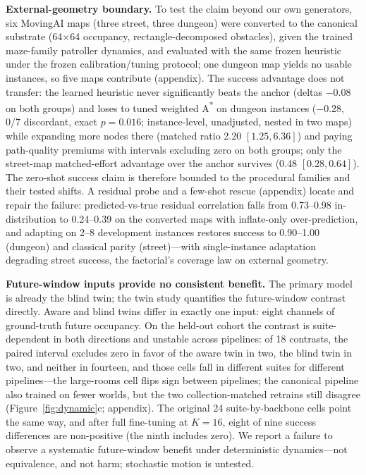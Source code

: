 \documentclass[letterpaper]{article} %
\begin{document}
\textbf{External-geometry boundary.} To test the claim beyond our own generators, six MovingAI maps \citep{sturtevant2012movingai} (three street, three dungeon) were converted to the canonical substrate (64$\times$64 occupancy, rectangle-decomposed obstacles), given the trained maze-family patroller dynamics, and evaluated with the same frozen heuristic under the frozen calibration/tuning protocol; one dungeon map yields no usable instances, so five maps contribute (appendix). The success advantage does not transfer: the learned heuristic never significantly beats the anchor (deltas $-0.08$ on both groups) and loses to tuned weighted A\textsuperscript{*} on dungeon instances ($-0.28$, 0/7 discordant, exact $p{=}0.016$; instance-level, unadjusted, nested in two maps) while expanding more nodes there (matched ratio 2.20 $[1.25, 6.36]$) and paying path-quality premiums with intervals excluding zero on both groups; only the street-map matched-effort advantage over the anchor survives (0.48 $[0.28, 0.64]$). The zero-shot success claim is therefore bounded to the procedural families and their tested shifts. A residual probe and a few-shot rescue (appendix) locate and repair the failure: predicted-vs-true residual correlation falls from 0.73--0.98 in-distribution to 0.24--0.39 on the converted maps with inflate-only over-prediction, and adapting on 2--8 development instances restores success to 0.90--1.00 (dungeon) and classical parity (street)---with single-instance adaptation degrading street success, the factorial's coverage law on external geometry.

\textbf{Future-window inputs provide no consistent benefit.} The primary model is already the blind twin; the twin study quantifies the future-window contrast directly. Aware and blind twins differ in exactly one input: eight channels of ground-truth future occupancy. On the held-out cohort the contrast is suite-dependent in both directions and unstable across pipelines: of 18 contrasts, the paired interval excludes zero in favor of the aware twin in two, the blind twin in two, and neither in fourteen, and those cells fall in different suites for different pipelines---the large-rooms cell flips sign between pipelines; the canonical pipeline also trained on fewer worlds, but the two collection-matched retrains still disagree (Figure~\ref{fig:dynamic}c; appendix). The original 24 suite-by-backbone cells point the same way, and after full fine-tuning at $K{=}16$, eight of nine success differences are non-positive (the ninth includes zero). We report a failure to observe a systematic future-window benefit under deterministic dynamics---not equivalence, and not harm; stochastic motion is untested.
\end{document}
